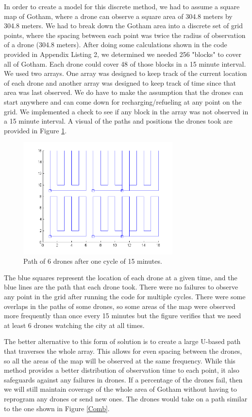 \documentclass{article}
\begin{document}
In order to create a model for this discrete method, we had to assume a square map of Gotham, where a drone can observe a square area of 304.8 meters by 304.8 meters. We had to break down the Gotham area into a discrete set of grid points, where the spacing between each point was twice the radius of observation of a drone (304.8 meters). After doing some calculations shown in the code provided in Appendix Listing 2, we determined we needed 256 "blocks" to cover all of Gotham. Each drone could cover 48 of those blocks in a 15 minute interval. We used two arrays. One array was designed to keep track of the current location of each drone and another array was designed to keep track of time since that area was last observed. We do have to make the assumption that the drones can start anywhere and can come down for recharging/refueling at any point on the grid. We implemented a check to see if any block in the array was not observed in a 15 minute interval. A visual of the paths and positions the drones took are provided in Figure \ref{M1Path}.

\begin{figure}[htb!]
\begin{center}
\includegraphics[width=3.2in]{M1Path.png}
\end{center}
\caption{Path of 6 drones after one cycle of 15 minutes.
\label{M1Path}}
\end{figure} 

The blue squares represent the location of each drone at a given time, and the blue lines are the path that each drone took. There were no failures to observe any point in the grid after running the code for multiple cycles. There were some overlaps in the paths of some drones, so some areas of the map were observed more frequently than once every 15 minutes but the figure verifies that we need at least 6 drones watching the city at all times.

The better alternative to this form of solution is to create a large U-based path that traverses the whole array. This allows for even spacing between the drones, so all the areas of the map will be observed at the same frequency. While this method provides a better distribution of observation time to each point, it also safeguards against any failures in drones. If a percentage of the drones fail, then we will still maintain coverage of the whole area of Gotham without having to reprogram any drones or send new ones. The drones would take on a path similar to the one shown in Figure \ref{Comb}.  
\end{document}
